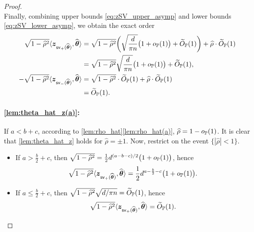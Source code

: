 \begin{proof}
~\\
\noindent
Finally, combining upper bounds \cref{eq:zSV_upper_asymp} and lower bounds \cref{eq:zSV_lower_asymp}, we obtain the exact order
\begin{equation*}
    \begin{aligned}
        \phantom{-} \sqrt{1 - \hat\rho^2} \< \zz_{\mathsf{sv}_+(\hat\vtheta)}, \hat\vtheta \>  
        & =  \sqrt{1 - \hat\rho^2} \biggl( \sqrt{\frac{d}{\pi n}}\big(1 + o_\P(1) \big) 
        + \wt O_\P(1)
        \biggr)
        + 
        \hat\rho \cdot \wt O_\P(1) \\
        & = \sqrt{1 - \hat\rho^2} \sqrt{\frac{d}{\pi n}}\big(1 + o_\P(1) \big) 
        + \wt O_\P(1),
        \\
        - \sqrt{1 - \hat\rho^2} \< \zz_{\mathsf{sv}_-(\hat\vtheta)}, \hat\vtheta \> 
        & =  \sqrt{1 - \hat\rho^2} \cdot \wt O_\P(1) + 
        \hat\rho \cdot \wt O_\P(1) \\
        & = \wt O_\P(1).
    \end{aligned}
\end{equation*}


\paragraph{\ref{lem:theta_hat_z(a)}:}
If $a < b + c$, according to \cref{lem:rho_hat}\ref{lem:rho_hat(a)}, $\hat\rho = 1 - o_\P(1)$. It is clear that \cref{lem:theta_hat_z} holds for $\hat\rho = \pm 1$. Now, restrict on the event $\{ |\hat\rho| < 1 \}$.
\begin{itemize}
    \item If $a > \frac{b}{2} + c$, then $\sqrt{1 - \hat\rho^2} = \frac12 d^{(a-b-c)/2}\bigl( 1 + o_\P(1) \bigr)$, hence
    \begin{equation*}
        \sqrt{1 - \hat\rho^2} \< \zz_{\mathsf{sv}_+(\hat\vtheta)}, \hat\vtheta \>
        = \frac12 d^{a - \frac{b}{2} - c}\big(1 + o_\P(1) \big).
    \end{equation*}
    \item If $a \le \frac{b}{2} + c$, then $\sqrt{1 - \hat\rho^2}\sqrt{d/\pi n} = \wt O_\P(1)$, hence
    \begin{equation*}
        \sqrt{1 - \hat\rho^2} \< \zz_{\mathsf{sv}_+(\hat\vtheta)}, \hat\vtheta \>
        = \wt O_\P(1).
    \end{equation*}
\end{itemize}

\end{proof}
